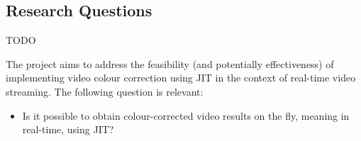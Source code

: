 \documentclass[12pt,a4paper]{article}
\begin{document}















\subsection{Research Questions} \label{subsection:researchquestions}
TODO

The project aims to address the feasibility (and potentially effectiveness) of implementing video colour correction using JIT in the context of real-time video streaming. The following question is relevant:

\begin{itemize}
	\item Is it possible to obtain colour-corrected video results on the fly, meaning in real-time, using JIT?
\end{itemize}
\end{document}
